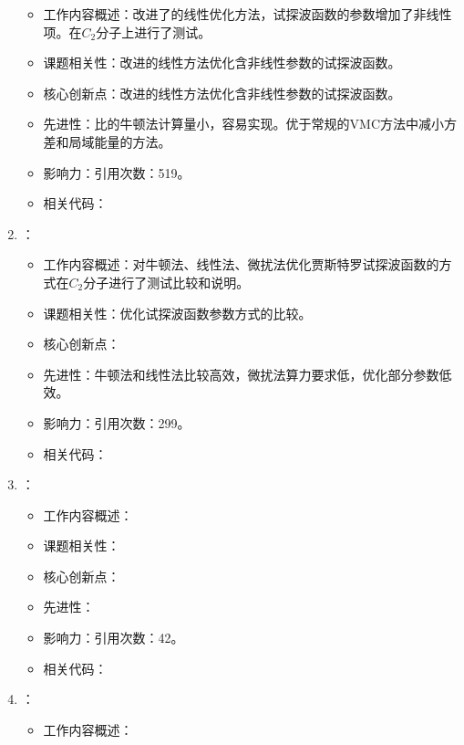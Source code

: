 \begin{enumerate}
\begin{itemize}
                \item 工作内容概述：改进了\citet{nightingale2001optimization}的线性优化方法，试探波函数的参数增加了非线性项。在$C_2$分子上进行了测试。
                \item 课题相关性：改进的线性方法优化含非线性参数的试探波函数。
                \item 核心创新点：改进的线性方法优化含非线性参数的试探波函数。
                \item 先进性：比\citet{umrigar2005energy}的牛顿法计算量小，容易实现。优于常规的VMC方法中减小方差和局域能量的方法。
                \item 影响力：引用次数：519。
                \item 相关代码：
            \end{itemize}
        \item \citet{toulouse2007optimization}：
            \begin{itemize}
                \item 工作内容概述：对牛顿法\citep{umrigar2005energy}、线性法\citep{umrigar2007alleviation}、微扰法\citep{scemama2006simple}优化贾斯特罗试探波函数的方式在$C_2$分子进行了测试比较和说明。
                \item 课题相关性：优化试探波函数参数方式的比较。
                \item 核心创新点：
                \item 先进性：牛顿法和线性法比较高效，微扰法算力要求低，优化部分参数低效。
                \item 影响力：引用次数：299。
                \item 相关代码：
            \end{itemize}
            \item \citet{nemec2010diffusion}：
            \begin{itemize}
                \item 工作内容概述：
                \item 课题相关性：
                \item 核心创新点：
                \item 先进性：
                \item 影响力：引用次数：42。
                \item 相关代码：
            \end{itemize}
            \item \citet{boninsegni2012population}：
            \begin{itemize}
                \item 工作内容概述：

\end{itemize}
\end{enumerate}
